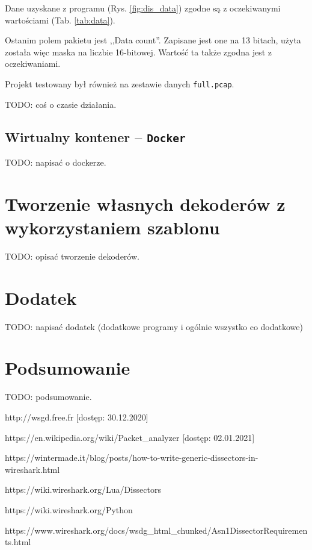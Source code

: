 \documentclass[a4paper, 12pt, twoside, openright]{article}
\begin{document}
	Dane uzyskane z programu (Rys. \ref{fig:dis_data}) zgodne są z oczekiwanymi wartościami (Tab. \ref{tab:data}).

	Ostanim polem pakietu jest ,,Data count''. Zapisane jest one na 13 bitach, użyta została więc maska na liczbie 16-bitowej.
	Wartość ta także zgodna jest z oczekiwaniami.

	Projekt testowany był również na zestawie danych \texttt{full.pcap}.

	TODO: coś o czasie działania.

	\subsection{Wirtualny kontener -- \texttt{Docker}}

	TODO: napisać o dockerze.


\newpage
\section{Tworzenie własnych dekoderów z wykorzystaniem szablonu}

	TODO: opisać tworzenie dekoderów.

\newpage
\section{Dodatek}

	TODO: napisać dodatek (dodatkowe programy i ogólnie wszystko co dodatkowe)

\newpage
\section{Podsumowanie}

	TODO: podsumowanie.

\newpage

\begin{thebibliography}{99}

		http://wsgd.free.fr [dostęp: 30.12.2020]

		https://en.wikipedia.org/wiki/Packet\_analyzer [dostęp: 02.01.2021]

		https://wintermade.it/blog/posts/how-to-write-generic-dissectors-in-wireshark.html

		https://wiki.wireshark.org/Lua/Dissectors

		https://wiki.wireshark.org/Python

		https://www.wireshark.org/docs/wsdg\_html\_chunked/Asn1DissectorRequirements.html


\end{thebibliography}


\vspace{85mm}
\end{document}
